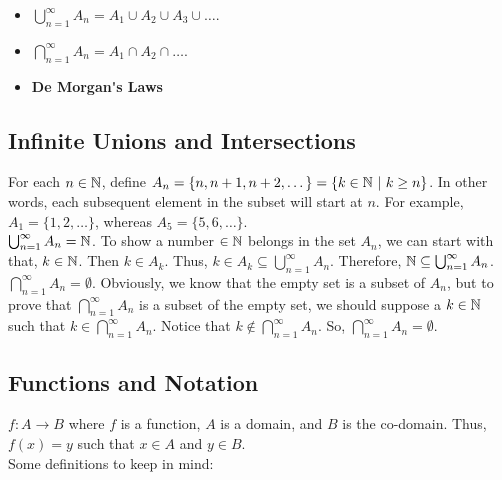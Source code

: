 \begin{itemize}
\item \(\displaystyle \bigcup^\infty_{n=1} A_n = A_1 \cup A_2 \cup A_3 \cup \dots\). \\

\item \(\displaystyle \bigcap^\infty_{n=1} A_n = A_1 \cap A_2 \cap \dots\). \\

\item \textbf{\Gls{De Morgan's Laws}} \\
\end{itemize}


\pfs

\subsection{Infinite Unions and Intersections} \hfill

For each \(n \in \mathbb{N}\), define \(A_n = \{n, n+1, n+2,\dots\} = \{k \in \mathbb{N} \ | \ k \geq n\}\). In other words, each subsequent element in the subset will start at \(n\). For example, \(A_1 = \{1,2,\dots\}\), whereas \(A_5 = \{5,6,\dots\}.\)   \\

\(\bigcup^\infty_{n=1} A_n = \mathbb{N}\). To show a number \(\in \mathbb{N}\) belongs in the set \(A_n\), we can start with that, \(k \in \mathbb{N}\). Then \(k \in A_k\). Thus, \(k \in A_k \subseteq \bigcup^\infty_{n=1}A_n\). Therefore, \(\mathbb{N} \subseteq \bigcup^\infty_{n=1}A_n\). \\

\(\bigcap^\infty_{n=1}A_n = \emptyset\). Obviously, we know that the empty set is a subset of \(A_n\), but to prove that \(\bigcap^\infty_{n=1}A_n\) is a subset of the empty set, we should suppose a \(k \in \mathbb{N}\) such that \(k \in \bigcap^\infty_{n=1}A_n\). Notice that \(k \notin \bigcap^\infty_{n=1}A_n\). So, \(\bigcap^\infty_{n=1}A_n = \emptyset\).

\pfs

\subsection{Functions and Notation} \hfill

\(f \colon A \rightarrow B\) where \(f\) is a function, \(A\) is a domain, and \(B\) is the co-domain. Thus, \(f(x) = y\) such that \(x \in A\) and \(y \in B\). \\

Some definitions to keep in mind: \\

